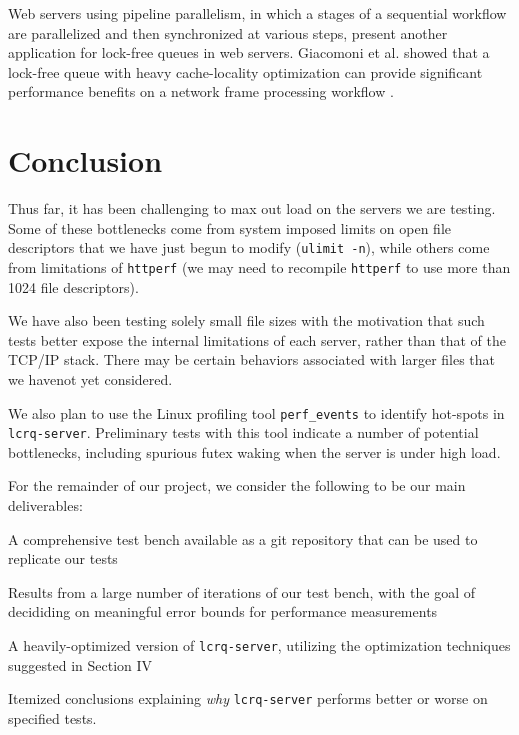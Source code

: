 \documentclass[twoside,10pt]{article}
\begin{document}
\begin{multicols}{2}
Web servers using pipeline parallelism, in which a stages of a
sequential workflow are parallelized and then synchronized at various
steps, present another application for lock-free queues in web
servers. Giacomoni et al. showed that a lock-free queue with heavy
cache-locality optimization can provide significant performance
benefits on a network frame processing workflow
\cite{giacomoni2008fastforward}.

\section{Conclusion}

Thus far, it has been challenging to max out load on the servers we
are testing. Some of these bottlenecks come from system imposed limits
on open file descriptors that we have just begun to modify
(\verb+ulimit -n+), while others come from limitations of
\verb+httperf+ (we may need to recompile \verb+httperf+ to use more
than 1024 file descriptors).

We have also been testing solely small file sizes with the motivation
that such tests better expose the internal limitations of each server,
rather than that of the TCP/IP stack. There may be certain behaviors
associated with larger files that we havenot yet considered.

We also plan to use the Linux profiling tool \verb+perf_events+ to
identify hot-spots in \verb+lcrq-server+. Preliminary tests with this
tool indicate a number of potential bottlenecks, including spurious
futex waking when the server is under high load.

For the remainder of our project, we consider the following to be our
main deliverables:

\begin{compactitem}
\item A comprehensive test bench available as a git repository that
  can be used to replicate our tests
\item Results from a large number of iterations of our test bench,
  with the goal of decididing on meaningful error bounds for
  performance measurements
\item A heavily-optimized version of \verb+lcrq-server+, utilizing the
  optimization techniques suggested in Section IV
\item Itemized conclusions explaining \emph{why} \verb+lcrq-server+
  performs better or worse on specified tests.
\end{compactitem}

\end{multicols}

{\small
  
  
}
\end{document}
